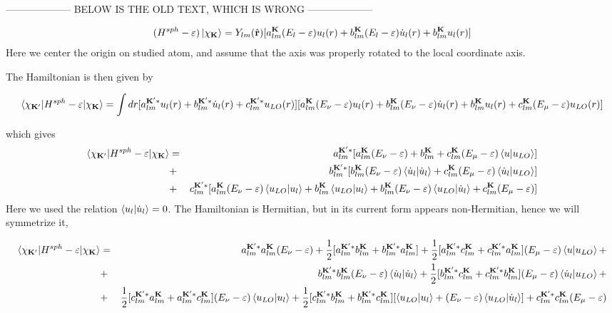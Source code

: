 \documentclass[aps,prb,floatfix,epsfig,singlecolumn,showpacs,preprintnumbers]{revtex4}
\renewcommand{\vr}{{\mathbf{r}}}
\newcommand{\vK}{{\mathbf{K}}}
\begin{document}
--------------------
BELOW IS THE OLD TEXT, WHICH IS WRONG
--------------------

\begin{eqnarray}
(H^{sph}-\varepsilon)\ket{\chi_\vK}=
Y_{lm}(\hat{\vr})
[a_{lm}^{\vK}(E_l-\varepsilon) u_l(r) + b_{lm}^\vK(E_l-\varepsilon)\dot{u}_l(r) + b_{lm}^\vK u_l(r)]
\end{eqnarray}
Here we center the origin on studied atom, and assume that the axis
was properly rotated to the local coordinate axis.

The Hamiltonian is then given by
\begin{small}
\begin{eqnarray}
\braket{\chi_{\vK'}|H^{sph}-\varepsilon|\chi_\vK}=
\int dr [a^{\vK' *}_{lm} u_l(r) + b^{\vK' *}_{lm}  \dot{u}_l(r)+c^{\vK' *}_{lm} u_{LO}(r)]
[a_{lm}^{\vK}(E_\nu-\varepsilon) u_l(r) + b_{lm}^\vK(E_\nu-\varepsilon)\dot{u}_l(r) + b_{lm}^\vK u_l(r) + c_{lm}^\vK(E_{\mu}-\varepsilon)u_{LO}(r)]
\end{eqnarray}
\end{small}
which gives
\begin{eqnarray}
\braket{\chi_{\vK'}|H^{sph}-\varepsilon|\chi_\vK}&=&
a^{\vK' *}_{lm} [a_{lm}^{\vK}(E_\nu-\varepsilon)  + b_{lm}^\vK + c_{lm}^\vK(E_{\mu}-\varepsilon)\braket{u|u_{LO}}]\nonumber\\
&+&b^{\vK' *}_{lm} [b_{lm}^\vK(E_\nu-\varepsilon)\braket{\dot{u}_l|\dot{u}_l} + c_{lm}^\vK(E_{\mu}-\varepsilon)\braket{\dot{u}_l|u_{LO}}]\nonumber\\
&+&c^{\vK' *}_{lm} [a_{lm}^{\vK}(E_\nu-\varepsilon) \braket{u_{LO}|u_l}  +b_{lm}^\vK \braket{u_{LO}|u_l} + b_{lm}^\vK(E_\nu-\varepsilon)\braket{u_{LO}|\dot{u}_l}  + c_{lm}^\vK(E_{\mu}-\varepsilon)]
\end{eqnarray}
Here we used the relation $\braket{u_l|\dot{u}_l}=0$.
The Hamiltonian is Hermitian, but in its current form appears
non-Hermitian, hence we will symmetrize it, 
\begin{small}
\begin{eqnarray}
\braket{\chi_{\vK'}|H^{sph}-\varepsilon|\chi_\vK}&=&
a^{\vK' *}_{lm}  a_{lm}^{\vK}(E_\nu-\varepsilon)  + 
\frac{1}{2}[a^{\vK' *}_{lm} b_{lm}^\vK +b_{lm}^{\vK'*} a^{\vK}_{lm} ]+
\frac{1}{2}[a^{\vK' *}_{lm} c_{lm}^\vK + c^{\vK' *}_{lm} a_{lm}^\vK ] (E_{\mu}-\varepsilon)\braket{u|u_{LO}}+
\nonumber\\
&+&
b^{\vK' *}_{lm}  b_{lm}^\vK(E_\nu-\varepsilon)\braket{\dot{u}_l|\dot{u}_l} +
\frac{1}{2}[b^{\vK' *}_{lm}   c_{lm}^\vK +c^{\vK' *}_{lm}  b_{lm}^\vK ]
(E_{\mu}-\varepsilon)\braket{\dot{u}_l|u_{LO}}+
\nonumber\\
&+&
\frac{1}{2}[c^{\vK' *}_{lm} a_{lm}^{\vK} +a^{\vK' *}_{lm} c_{lm}^{\vK} ] (E_\nu-\varepsilon) \braket{u_{LO}|u_l}  +
\frac{1}{2}[c^{\vK' *}_{lm}  b_{lm}^\vK + b^{\vK' *}_{lm}  c_{lm}^\vK ][ \braket{u_{LO}|u_l}  + (E_\nu-\varepsilon)\braket{u_{LO}|\dot{u}_l} ] + 
c^{\vK' *}_{lm}  c_{lm}^\vK(E_{\mu}-\varepsilon)
\nonumber
\end{eqnarray}
\end{small}
\end{document}
